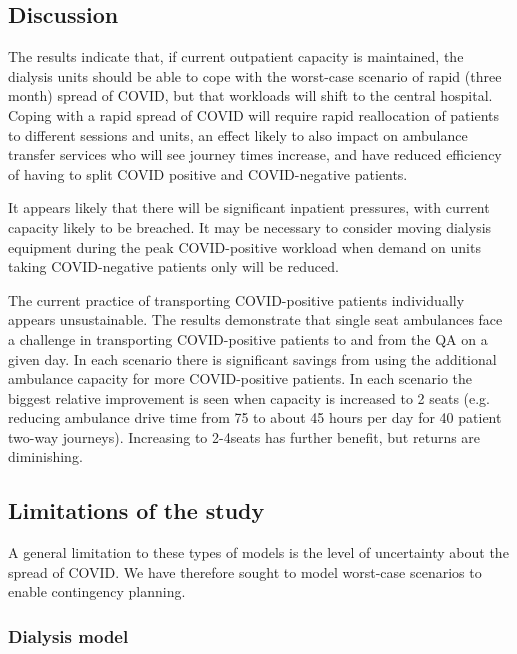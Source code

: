 \begin{multicols}{2}

\section{Discussion}

The results indicate that, if current outpatient capacity is maintained, the dialysis units should be able to cope with the worst-case scenario of rapid (three month) spread of COVID, but that workloads will shift to the central hospital. Coping with a rapid spread of COVID will require rapid reallocation of patients to different sessions and units, an effect likely to also impact on ambulance transfer services  who will see journey times increase, and have reduced efficiency of having to split COVID positive and COVID-negative patients. 

It appears likely that there will be significant inpatient pressures, with current capacity likely to be breached. It may be necessary to consider moving dialysis equipment during the peak COVID-positive workload when demand on units taking COVID-negative patients only will be reduced.

The current practice of transporting COVID-positive patients individually appears unsustainable. The results demonstrate that single seat ambulances face a challenge in transporting COVID-positive patients to and from the QA on a given day. In each scenario there is significant savings from using the additional ambulance capacity for more COVID-positive patients. In each scenario the biggest relative improvement is seen when capacity is increased to 2 seats (e.g. reducing ambulance drive time from 75 to about 45 hours per day for 40 patient two-way journeys). Increasing to 2-4seats has further benefit, but returns are diminishing.

\subsection{Limitations of the study}

A general limitation to these types of models is the level of uncertainty about the spread of COVID. We have therefore sought to model worst-case scenarios to enable contingency planning. 

\subsubsection{Dialysis model}


\end{multicols}
